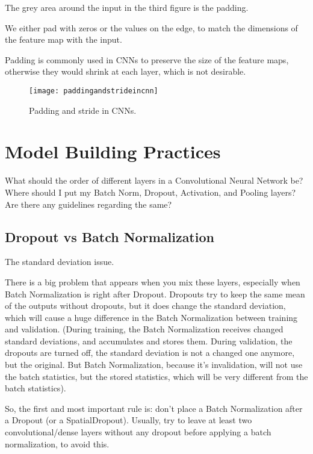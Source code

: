 	\begin{bulletedlist}
		\item The grey area around the input in the third figure is the padding.
		\item We either pad with zeros or the values on the edge, to match the dimensions of the feature map with the input.
		\item Padding is commonly used in CNNs to preserve the size of the feature maps, otherwise they would shrink at each layer, which is not desirable.
	\end{bulletedlist}

	\begin{figure}[h]
		\centering
		\texttt{[image: paddingandstrideincnn]}
		\caption[Padding and stride in CNNs]{Padding and stride in CNNs.}
		\label{fig:paddingandstrideincnn}
	\end{figure}





	\section{Model Building Practices}
What should the order of different layers in a Convolutional Neural Network be? Where should I put my Batch Norm, Dropout, Activation, and Pooling layers?  Are there any guidelines regarding the same?

	\subsection{Dropout vs Batch Normalization}
The standard deviation issue.

There is a big problem that appears when you mix these layers, especially when Batch Normalization is right after Dropout.
Dropouts try to keep the same mean of the outputs without dropouts, but it does change the standard deviation, which will cause a huge difference in the Batch Normalization between training and validation. (During training, the Batch Normalization receives changed standard deviations, and accumulates and stores them. During validation, the dropouts are turned off, the standard deviation is not a changed one anymore, but the original. But Batch Normalization, because it's invalidation, will not use the batch statistics, but the stored statistics, which will be very different from the batch statistics).

So, the first and most important rule is: don't place a Batch Normalization after a Dropout (or a SpatialDropout).
Usually,  try to leave at least two convolutional/dense layers without any dropout before applying a batch normalization, to avoid this.

